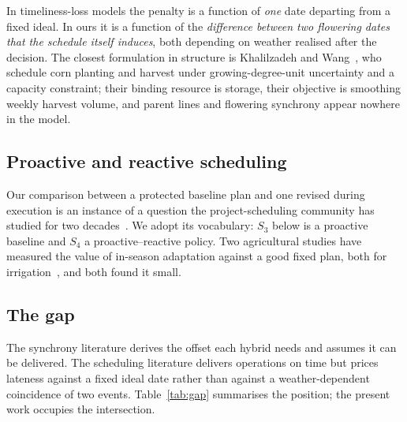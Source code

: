 \documentclass[10pt,twocolumn]{article}
\begin{document}
In timeliness-loss models the penalty is a function of \emph{one} date
departing from a fixed ideal. In ours it is a function of the
\emph{difference between two flowering dates that the schedule itself
induces}, both depending on weather realised after the decision. The
closest formulation in structure is Khalilzadeh and
Wang~\cite{khalilzadeh2022}, who schedule corn planting and harvest under
growing-degree-unit uncertainty and a capacity constraint; their binding
resource is storage, their objective is smoothing weekly harvest volume, and
parent lines and flowering synchrony appear nowhere in the model.

\subsection{Proactive and reactive scheduling}

Our comparison between a protected baseline plan and one revised during
execution is an instance of a question the project-scheduling community has
studied for two decades~\cite{lambrechts2007,vandevonder2007,%
demeulemeester2009}. We adopt its vocabulary: $S_3$ below is a proactive
baseline and $S_4$ a proactive--reactive policy. Two agricultural studies
have measured the value of in-season adaptation against a good fixed plan,
both for irrigation~\cite{kelly2023,becker2026}, and both found it small.

\subsection{The gap}

The synchrony literature derives the offset each hybrid needs and assumes it
can be delivered. The scheduling literature delivers operations on time but
prices lateness against a fixed ideal date rather than against a
weather-dependent coincidence of two events. Table~\ref{tab:gap} summarises
the position; the present work occupies the intersection.
\end{document}
